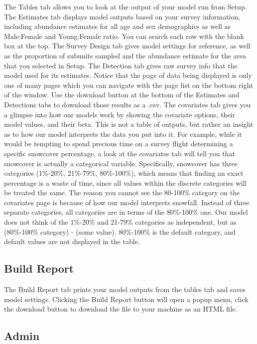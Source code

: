 \documentclass[
]{book}
\begin{document}
The Tables tab allows you to look at the output of your model run from Setup. The Estimates tab displays model outputs based on your survey information, including abundance estimates for all age and sex demographics as well as Male:Female and Young:Female ratio. You can search each row with the blank box at the top. The Survey Design tab gives model settings for reference, as well as the proportion of subunits sampled and the abundance estimate for the area that you selected in Setup. The Detection tab gives raw survey info that the model used for its estimates. Notice that the page of data being displayed is only one of many pages which you can navigate with the page list on the bottom right of the window. Use the download button at the bottom of the Estimates and Detections tabs to download those results as a .csv. The covariates tab gives you a glimpse into how our models work by showing the covariate options, their {model values}, and their {beta}. This is not a table of outputs, but rather an insight as to how our model interprets the data you put into it. For example, while it would be tempting to spend precious time on a survey flight determining a specific snowcover percentage, a look at the covariates tab will tell you that snowcover is actually a categorical variable. Specifically, snowcover has three categories (1\%-20\%, 21\%-79\%, 80\%-100\%), which means that finding an exact percentage is a waste of time, since all values within the discrete categories will be treated the same. The reason you cannot see the 80-100\% category on the covariates page is because of how our model interprets snowfall. Instead of three separate categories, all categories are in terms of the 80\%-100\% one. Our model does not think of the 1\%-20\% and 21-79\% categories as independent, but as (80\%-100\% category) - (some value). 80\%-100\% is the default category, and default values are not displayed in the table.

\hypertarget{sight-report}{%
\subsection{Build Report}\label{sight-report}}

The Build Report tab prints your model outputs from the tables tab and saves model settings. Clicking the Build Report button will open a popup menu, click the download button to download the file to your machine as an HTML file.

\hypertarget{sight-admin}{%
\subsection{Admin}\label{sight-admin}}
\end{document}
